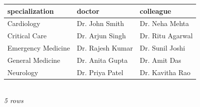 {\scriptsize\setlength{\tabcolsep}{2.5pt}\begin{tabular}{lll}\toprule
\textbf{specialization} & \textbf{doctor} & \textbf{colleague} \\\midrule
Cardiology & Dr. John Smith & Dr. Neha Mehta \\
Critical Care & Dr. Arjun Singh & Dr. Ritu Agarwal \\
Emergency Medicine & Dr. Rajesh Kumar & Dr. Sunil Joshi \\
General Medicine & Dr. Anita Gupta & Dr. Amit Das \\
Neurology & Dr. Priya Patel & Dr. Kavitha Rao \\
\bottomrule\end{tabular}}\\[-1pt]{\tiny\itshape 5 rows}
